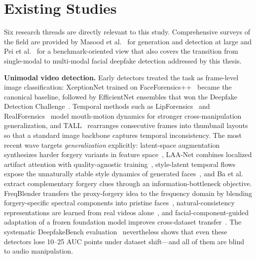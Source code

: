 \section{Existing Studies}
\label{sec:existing}

Six research threads are directly relevant to this study. Comprehensive
surveys of the field are provided by Masood et al.~\cite{masood2023survey}
for generation and detection at large and Pei et al.~\cite{pei2024survey} for a
benchmark-oriented view that also covers the transition from single-modal to
multi-modal facial deepfake detection addressed by this thesis.

\textbf{Unimodal video detection.} Early detectors treated the task as
frame-level image classification: XceptionNet trained on
FaceForensics++~\cite{rossler2019faceforensics} became the canonical baseline,
followed by EfficientNet ensembles that won the Deepfake Detection
Challenge~\cite{dolhansky2020dfdc}. Temporal methods such as
LipForensics~\cite{haliassos2021lipforensics} and
RealForensics~\cite{haliassos2022realforensics} model mouth-motion dynamics for
stronger cross-manipulation generalization, and TALL~\cite{xu2023tall}
rearranges consecutive frames into thumbnail layouts so that a standard image
backbone captures temporal inconsistency. The most recent wave targets
\emph{generalization} explicitly: latent-space augmentation synthesizes
harder forgery variants in feature space~\cite{yan2024lsda}, LAA-Net combines
localized artifact attention with quality-agnostic training~\cite{nguyen2024laanet},
style-latent temporal flows expose the unnaturally stable style dynamics of
generated faces~\cite{choi2024stylelatent}, and Ba et
al.~\cite{ba2024exposing} extract complementary forgery clues through an
information-bottleneck objective. FreqBlender transfers the proxy-forgery idea
to the frequency domain by blending forgery-specific spectral components into
pristine faces~\cite{li2024freqblender}, natural-consistency
representations are learned from real videos alone~\cite{zhang2024naturalconsistency},
and facial-component-guided adaptation of a frozen foundation model
improves cross-dataset transfer~\cite{han2025facialcomponent}. The systematic DeepfakeBench
evaluation~\cite{yan2023deepfakebench} nevertheless shows that even these
detectors lose 10--25 AUC points under dataset shift---and all of them are
blind to audio manipulation.

